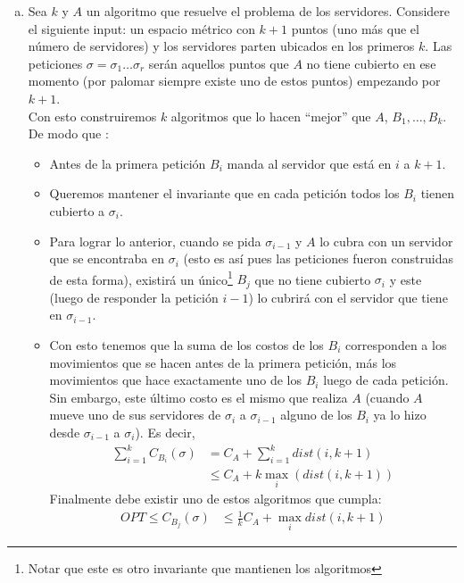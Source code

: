 \documentclass[dcc,uchile]{fcfmcourse}
\theoremstyle{plain}
\theoremstyle{definition}
\begin{document}
\begin{problems}
\begin{enumerate}[a)]
\end{enumerate}
\item
\begin{enumerate}[a)]
    \item Sea $k$ y $A$ un algoritmo que resuelve el problema de los servidores. Considere el siguiente input: un espacio métrico con $k+1$ puntos (uno más que el número de servidores) y los servidores parten ubicados en los primeros $k$. Las peticiones $\sigma=\sigma_{1}\ldots\sigma_{r}$ serán aquellos puntos que $A$ no tiene cubierto en ese momento \demon (por palomar siempre existe uno de estos puntos) empezando por $k+1$.\\

Con esto construiremos $k$ algoritmos que lo hacen ``mejor'' que $A$, $B_{1}, \ldots, B_{k}$. De modo que :
\begin{itemize}
    \item Antes de la primera petición $B_{i}$ manda al servidor que está en $i$ a $k+1$.
    \item Queremos mantener el invariante que en cada petición todos los $B_{i}$ tienen cubierto a $\sigma_{i}$.
    \item Para lograr lo anterior, cuando se pida $\sigma_{i-1}$ y $A$ lo cubra con un servidor que se encontraba en $\sigma_{i}$ (esto es así pues las peticiones fueron construidas de esta forma), existirá un único\footnote{Notar que este es otro invariante que mantienen los algoritmos} $B_{j}$ que no tiene cubierto $\sigma_{i}$ y este (luego de responder la petición $i-1$) lo cubrirá con el servidor que tiene en $\sigma_{i-1}$.
    \item Con esto tenemos que la suma de los costos de los $B_{i}$ corresponden a los movimientos que se hacen antes de la primera petición, más los movimientos que hace exactamente uno de los $B_{i}$ luego de cada petición. Sin embargo, este último costo es el mismo que realiza $A$ (cuando $A$ mueve uno de sus servidores de $\sigma_{i}$ a $\sigma_{i-1}$ alguno de los $B_{i}$ ya lo hizo desde $\sigma_{i-1}$ a $\sigma_{i}$). Es decir,
    \begin{align*}
        \sum_{i=1}^k C_{B_{i}}(\sigma) &= C_{A} + \sum_{i=1}^k dist(i, k+1)\\
        &\le C_{A} + k\max_i (dist(i, k+1))
    \end{align*}
    Finalmente debe existir uno de estos algoritmos que cumpla:
    \begin{align*}
        OPT \le C_{B_{j}}(\sigma) &\le \frac{1}{k}C_{A} + \max_i dist(i, k+1)
    \end{align*}

\end{itemize}
\end{enumerate}
\end{problems}
\end{document}
